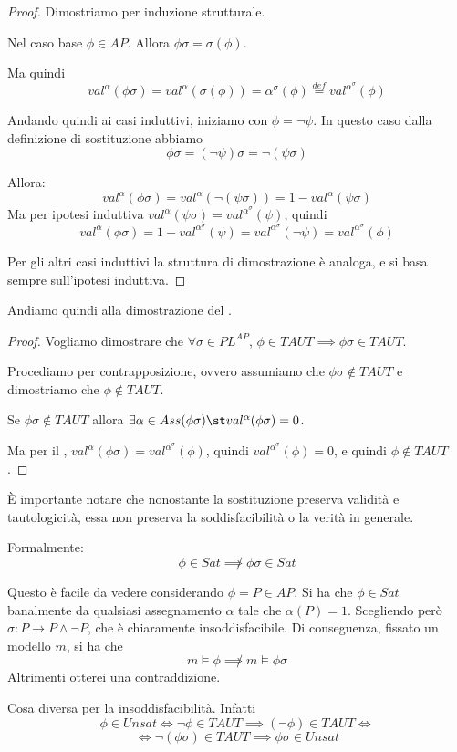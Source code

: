 \begin{proof}
  Dimostriamo per induzione strutturale.

  Nel caso base \(\phi \in AP\). Allora \(\phi\sigma = \sigma(\phi)\).

  Ma quindi
  \[val^{\alpha}(\phi\sigma) = val^\alpha(\sigma(\phi)) = \alpha^\sigma(\phi) \overset{def}{=} val^{\alpha^\sigma}(\phi)\]

  Andando quindi ai casi induttivi, iniziamo con \(\phi = \neg \psi\). In questo caso dalla definizione di sostituzione abbiamo
  \[\phi\sigma = (\neg\psi)\sigma = \neg(\psi\sigma)\]

  Allora:
  \[val^{\alpha}(\phi\sigma)= val^{\alpha}(\neg(\psi\sigma)) = 1 - val^{\alpha}(\psi\sigma)\]
  Ma per ipotesi induttiva \(val^{\alpha}(\psi\sigma) = val^{\alpha^\sigma}(\psi)\), quindi
  \[val^{\alpha}(\phi\sigma)= 1 - val^{\alpha^\sigma}(\psi) = val^{\alpha^\sigma}(\neg\psi) = val^{\alpha^\sigma}(\phi)\]

  Per gli altri casi induttivi la struttura di dimostrazione è analoga, e si basa sempre sull'ipotesi induttiva.
\end{proof}

Andiamo quindi alla dimostrazione del .
\begin{proof}{}
  Vogliamo dimostrare che \(\forall \sigma \in PL^{AP}\), \(\phi \in TAUT \implies \phi\sigma \in TAUT\).

  Procediamo per contrapposizione, ovvero assumiamo che \(\phi\sigma \not\in TAUT\) e dimostriamo che \(\phi \not\in TAUT\).

  Se \(\phi\sigma \not\in TAUT\) allora \(\exists \alpha \in Ass(\phi\sigma)\st val^\alpha(\phi\sigma) = 0\).

  Ma per il , \(val^\alpha(\phi\sigma) = val^{\alpha^\sigma}(\phi)\), quindi \(val^{\alpha^\sigma}(\phi) = 0\), e quindi \(\phi \not\in TAUT\).
\end{proof}

\begin{observation}{}
  È importante notare che nonostante la sostituzione preserva validità e tautologicità, essa non preserva la soddisfacibilità o la verità in generale.

  Formalmente:
  \[\phi \in Sat \not\implies \phi\sigma \in Sat\]

  Questo è facile da vedere considerando \(\phi = P \in AP\). Si ha che \(\phi \in Sat\) banalmente da qualsiasi assegnamento \(\alpha\) tale che \(\alpha(P)=1\).
  Scegliendo però \(\sigma : P \to P\land \neg P\), che è chiaramente insoddisfacibile.
  Di conseguenza, fissato un modello \(m\), si ha che
  \[m\models\phi \not\implies m\models\phi\sigma\]
  Altrimenti otterei una contraddizione.

  Cosa diversa per la insoddisfacibilità. Infatti
  \[\phi \in Unsat \iff \neg \phi \in TAUT \implies (\neg\phi)\in TAUT\iff \]
  \[\iff \neg(\phi\sigma) \in TAUT \implies \phi\sigma \in Unsat\]
\end{observation}

